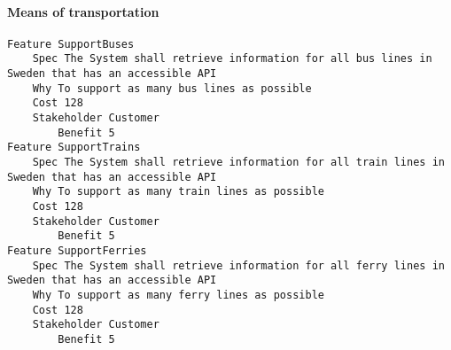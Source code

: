 				
			 \paragraph{Means of transportation}


\begin{lstlisting}
Feature SupportBuses
	Spec The System shall retrieve information for all bus lines in Sweden that has an accessible API
	Why To support as many bus lines as possible
	Cost 128
	Stakeholder Customer
		Benefit 5
Feature SupportTrains
	Spec The System shall retrieve information for all train lines in Sweden that has an accessible API
	Why To support as many train lines as possible
	Cost 128
	Stakeholder Customer
		Benefit 5
Feature SupportFerries
	Spec The System shall retrieve information for all ferry lines in Sweden that has an accessible API
	Why To support as many ferry lines as possible
	Cost 128
	Stakeholder Customer
		Benefit 5

\end{lstlisting}